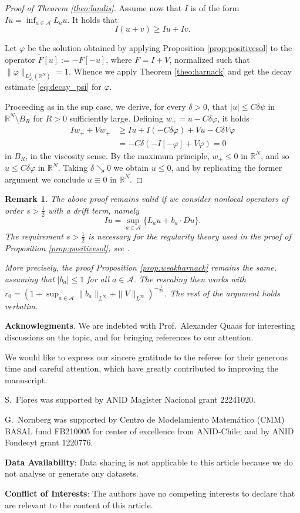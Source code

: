 \documentclass[a4paper,11pt]{article}
\newcommand{\R}{\mathbb{R}}
\newcommand{\I}{I}
\newcommand{\A}{\mathcal{A}}
\newcommand{\Lomega}{L_{\omega_s}^1(\R^N)}
\newtheorem{remark}{Remark}
\begin{document}
\begin{proof}[Proof of Theorem \ref{theo:landis}]
Assume now that $I$ is of the form $Iu = \inf_{a\in \A} L_a u$. It holds that
\[I(u+v) \geq Iu + Iv.\]

Let $\varphi$ be the solution obtained by applying Proposition \ref{prop:positivesol} to the operator $\tilde{F}[u] := -F[-u]$, where $F=\I +V$, normalized such that $\|\varphi\|_{\Lomega} = 1$. Whence we apply Theorem \ref{theo:harnack} and get the decay estimate \eqref{eq:decay_psi} for $\varphi$. 

Proceeding as in the sup case, we derive, for every $\delta >0$, that $|u| \leq C\delta \psi$ in $\R^N \setminus B_R$ for $R>0$ sufficiently large. Defining $w_+ = u-C\delta\varphi$, it holds
 \begin{align*}
Iw_+ + Vw_+ &\geq Iu  + I(-C\delta \varphi) + Vu - C\delta V\varphi \\
&= -C\delta(-I[-\varphi] + V\varphi) = 0
\end{align*}
in $B_R$, in the viscosity sense. By the maximum principle, $w_+ \leq 0$ in $\R^N$, and so $u\leq C\delta\varphi$ in $\R^N$. Taking $\delta \searrow 0$ we obtain $u\leq 0$, and by replicating the former argument we conclude $u\equiv 0$ in $\R^N$. 
\end{proof}

\begin{remark}
The above proof remains valid if we consider nonlocal operators of order $s>\frac12$ with a drift term, namely
\[Iu = \sup_{a\in \A}\{ L_a u + b_a \cdot Du\}.\]
The requirement $s>\frac12$ is necessary for the regularity theory used in the proof of Proposition \ref{prop:positivesol}, see \cite{Chang}.

More precisely, the proof Proposition \ref{prop:weakharnack} remains the same, assuming that $|b_a| \leq 1$ for all $a\in \A$. The rescaling then works with $r_0 = (1 + \sup_{a\in \A} \|b_a\|_{L^{\infty}} + \|V\|_{L^{\infty}})^{-\frac1{2s}}$. The rest of the argument holds verbatim. 
\end{remark}

\bigskip

{\small
	
	{\bf Acknowlegments}. We are indebted with Prof.\ Alexander Quaas for interesting discussions on the topic, and for bringing references \cite{BoVa, Felmer_Quaas_Tan_2012} to our attention.

	We would like to express our sincere gratitude to the referee for their generous time and careful attention, which have greatly contributed to improving the manuscript.	

	S.\ Flores was supported by ANID Magíster Nacional grant 22241020.
	
	G.\ Nornberg was supported by Centro de Modelamiento Matemático (CMM) BASAL fund FB210005 for center of excellence from ANID-Chile; and by ANID Fondecyt grant 1220776.
	
	{\bf Data Availability}: Data sharing is not applicable to this article because we do not analyse or generate any datasets.
	
	{\bf Conflict of Interests}: The authors have no competing interests to declare that are relevant to the content of this article.
}
\end{document}
